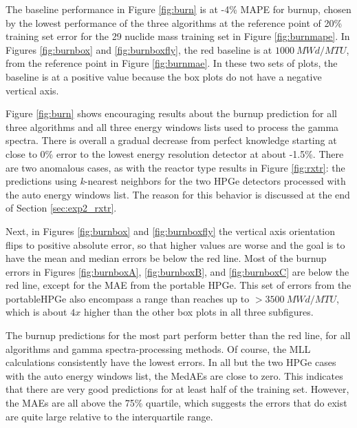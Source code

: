 The baseline performance in Figure \ref{fig:burn} is at -4\% \gls{MAPE} for
burnup, chosen by the lowest performance of the three algorithms at the
reference point of 20\% training set error for the 29 nuclide mass training set
in Figure \ref{fig:burnmape}. In Figures \ref{fig:burnbox} and
\ref{fig:burnboxfly}, the red baseline is at $1000\:MWd/MTU$, from the
reference point in Figure \ref{fig:burnmae}.  In these two sets of plots, the
baseline is at a positive value because the box plots do not have a negative
vertical axis. 

Figure \ref{fig:burn} shows encouraging results about the burnup prediction
for all three algorithms and all three energy windows lists used to process the
gamma spectra. There is overall a gradual decrease from perfect knowledge
starting at close to 0\% error to the lowest energy resolution detector at
about -1.5\%.  There are two anomalous cases, as with the reactor type results
in Figure \ref{fig:rxtr}: the predictions using \textit{k}-nearest neighbors
for the two \gls{HPGe} detectors processed with the auto energy windows list.
The reason for this behavior is discussed at the end of Section
\ref{sec:exp2_rxtr}. 

Next, in Figures \ref{fig:burnbox} and \ref{fig:burnboxfly} the vertical axis
orientation flips to positive absolute error, so that higher values are worse
and the goal is to have the mean and median errors be below the red line.  Most
of the burnup errors in Figures \ref{fig:burnboxA}, \ref{fig:burnboxB}, and
\ref{fig:burnboxC} are below the red line, except for the \gls{MAE} from the
portable \gls{HPGe}. This set of errors from the portable\gls{HPGe} also
encompass a range than reaches up to $>3500\:MWd/MTU$, which is about $4x$
higher than the other box plots in all three subfigures. 

The burnup predictions for the most part perform better than the red line, for
all algorithms and gamma spectra-processing methods.  Of course, the \gls{MLL}
calculations consistently have the lowest errors. In all but the two \gls{HPGe}
cases with the auto energy windows list, the \gls{MedAE}s are close to zero.
This indicates that there are very good predictions for at least half of the
training set.  However, the \gls{MAE}s are all above the 75\% quartile, which
suggests the errors that do exist are quite large relative to the interquartile
range.  


